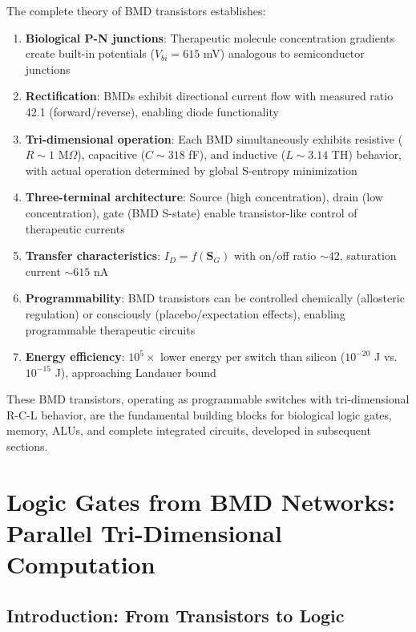 \documentclass[11pt,a4paper]{article}
\begin{document}
The complete theory of BMD transistors establishes:

\begin{enumerate}
\item \textbf{Biological P-N junctions}: Therapeutic molecule concentration gradients create built-in potentials ($V_{bi} = 615$ mV) analogous to semiconductor junctions

\item \textbf{Rectification}: BMDs exhibit directional current flow with measured ratio 42.1 (forward/reverse), enabling diode functionality

\item \textbf{Tri-dimensional operation}: Each BMD simultaneously exhibits resistive ($R \sim 1$ M$\Omega$), capacitive ($C \sim 318$ fF), and inductive ($L \sim 3.14$ TH) behavior, with actual operation determined by global S-entropy minimization

\item \textbf{Three-terminal architecture}: Source (high concentration), drain (low concentration), gate (BMD S-state) enable transistor-like control of therapeutic currents

\item \textbf{Transfer characteristics}: $I_D = f(\mathbf{S}_G)$ with on/off ratio $\sim 42$, saturation current $\sim 615$ nA

\item \textbf{Programmability}: BMD transistors can be controlled chemically (allosteric regulation) or consciously (placebo/expectation effects), enabling programmable therapeutic circuits

\item \textbf{Energy efficiency}: $10^5\times$ lower energy per switch than silicon ($10^{-20}$ J vs. $10^{-15}$ J), approaching Landauer bound
\end{enumerate}

These BMD transistors, operating as programmable switches with tri-dimensional R-C-L behavior, are the fundamental building blocks for biological logic gates, memory, ALUs, and complete integrated circuits, developed in subsequent sections.

\clearpage

\section{Logic Gates from BMD Networks: Parallel Tri-Dimensional Computation}

\subsection{Introduction: From Transistors to Logic}
\end{document}
